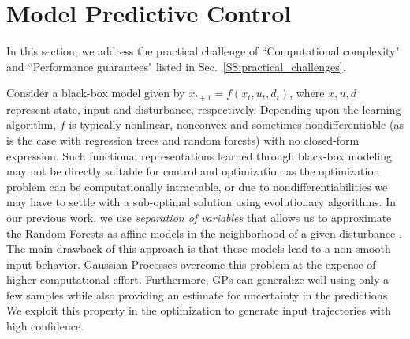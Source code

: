\section{Model Predictive Control}
\label{S:dpc}

In this section, we address the practical challenge of ``Computational complexity" and ``Performance guarantees" listed in Sec.~\ref{SS:practical_challenges}.

Consider a black-box model given by $x_{t+1}=f(x_t,u_t,d_t)$, where $x,u,d$ represent state, input and disturbance, respectively. Depending upon the learning algorithm, $f$ is typically nonlinear, nonconvex and sometimes nondifferentiable (as is the case with regression trees and random forests) with no closed-form expression. 
Such functional representations learned through black-box modeling may not be directly suitable for control and optimization as the optimization problem can be computationally intractable, or due to nondifferentiabilities we may have to settle with a sub-optimal solution using evolutionary algorithms. 
In our previous work, we use \textit{separation of variables} that allows us to approximate the Random Forests as affine models in the neighborhood of a given disturbance \cite{JainCDC2017}. 
The main drawback of this approach is that these models lead to a non-smooth input behavior. 
Gaussian Processes overcome this problem at the expense of higher computational effort.
Furthermore, GPs can generalize well using only a few samples while also providing an estimate for uncertainty in the predictions. 
We exploit this property in the optimization to generate input trajectories with high confidence.

